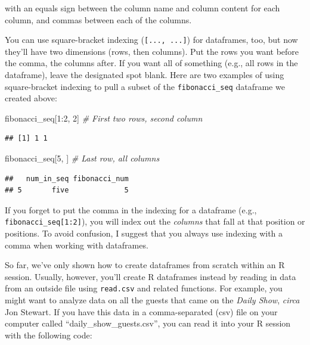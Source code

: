 \documentclass[]{book}
\makeatletter
\newenvironment{Shaded}{\begin{snugshade}}{\end{snugshade}}
\newcommand{\DecValTok}[1]{\textcolor[rgb]{0.00,0.00,0.81}{{#1}}}
\newcommand{\CommentTok}[1]{\textcolor[rgb]{0.56,0.35,0.01}{\textit{{#1}}}}
\newcommand{\NormalTok}[1]{{#1}}
\newenvironment{kframe}{%
\medskip{}
\setlength{\fboxsep}{.8em}
 \def\at@end@of@kframe{}%
 \ifinner\ifhmode%
  \def\at@end@of@kframe{\end{minipage}}%
  \begin{minipage}{\columnwidth}%
 \fi\fi%
 \def\FrameCommand##1{\hskip\@totalleftmargin \hskip-\fboxsep
 \colorbox{shadecolor}{##1}\hskip-\fboxsep
     \hskip-\linewidth \hskip-\@totalleftmargin \hskip\columnwidth}%
 \MakeFramed {\advance\hsize-\width
   \@totalleftmargin\z@ \linewidth\hsize
   \@setminipage}}%
 {\par\unskip\endMakeFramed%
 \at@end@of@kframe}
\renewenvironment{Shaded}{\begin{kframe}}{\end{kframe}}
\newenvironment{rmdblock}[1]
  {
  \begin{itemize}
  \renewcommand{\labelitemi}{
    \raisebox{-.7\height}[0pt][0pt]{
      {\setkeys{Gin}{width=3em,keepaspectratio}\texttt{[image: images/\#1]}}
    }
  }
  \setlength{\fboxsep}{1em}
  \begin{kframe}
  \item
  }
  {
  \end{kframe}
  \end{itemize}
  }
\newenvironment{rmdnote}
  {\begin{rmdblock}{note}}
  {\end{rmdblock}}
\makeatother
\begin{document}
with an equals sign between the column name and column content for each
column, and commas between each of the columns.

You can use square-bracket indexing (\texttt{{[}...,\ ...{]}}) for
dataframes, too, but now they'll have two dimensions (rows, then
columns). Put the rows you want before the comma, the columns after. If
you want all of something (e.g., all rows in the dataframe), leave the
designated spot blank. Here are two examples of using square-bracket
indexing to pull a subset of the \texttt{fibonacci\_seq} dataframe we
created above:

\begin{Shaded}
\begin{Highlighting}[]
\NormalTok{fibonacci_seq[}\DecValTok{1}\NormalTok{:}\DecValTok{2}\NormalTok{, }\DecValTok{2}\NormalTok{] }\CommentTok{# First two rows, second column}
\end{Highlighting}
\end{Shaded}

\begin{verbatim}
## [1] 1 1
\end{verbatim}

\begin{Shaded}
\begin{Highlighting}[]
\NormalTok{fibonacci_seq[}\DecValTok{5}\NormalTok{, ] }\CommentTok{# Last row, all columns}
\end{Highlighting}
\end{Shaded}

\begin{verbatim}
##   num_in_seq fibonacci_num
## 5       five             5
\end{verbatim}

\begin{rmdnote}
If you forget to put the comma in the indexing for a dataframe (e.g.,
\texttt{fibonacci\_seq{[}1:2{]}}), you will index out the \emph{columns}
that fall at that position or positions. To avoid confusion, I suggest
that you always use indexing with a comma when working with dataframes.
\end{rmdnote}

So far, we've only shown how to create dataframes from scratch within an
R session. Usually, however, you'll create R dataframes instead by
reading in data from an outside file using \texttt{read.csv} and related
functions. For example, you might want to analyze data on all the guests
that came on the \emph{Daily Show}, \emph{circa} Jon Stewart. If you
have this data in a comma-separated (csv) file on your computer called
``daily\_show\_guests.csv'', you can read it into your R session with
the following code:
\end{document}
